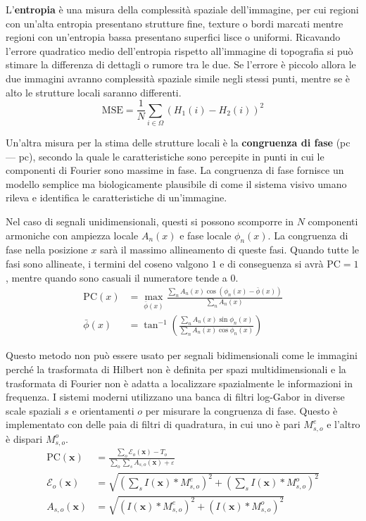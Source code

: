 \documentclass[../main.tex]{subfiles}
\begin{document}
L'\textbf{entropia} è una misura della complessità spaziale dell'immagine, per cui regioni con un'alta entropia presentano strutture fine, texture o bordi marcati mentre regioni con un'entropia bassa presentano superfici lisce o uniformi. Ricavando l'errore quadratico medio dell'entropia rispetto all'immagine di topografia si può stimare la differenza di dettagli o rumore tra le due. Se l'errore è piccolo allora le due immagini avranno complessità spaziale simile negli stessi punti, mentre se è alto le strutture locali saranno differenti.
\begin{equation}
	\text{MSE} = \frac{1}{N}\sum_{i\in\Omega}\left(H_1(i)-H_2(i)\right)^2
\end{equation}

Un'altra misura per la stima delle strutture locali è la \textbf{congruenza di fase} (\acrlong{pc} --- \acrshort{pc}), secondo la quale le caratteristiche sono percepite in punti in cui le componenti di Fourier sono massime in fase. La congruenza di fase fornisce un modello semplice ma biologicamente plausibile di come il sistema visivo umano rileva e identifica le caratteristiche di un'immagine.\cite{kovesi_1999,morrone_1988}

Nel caso di segnali unidimensionali, questi si possono scomporre in $N$ componenti armoniche con ampiezza locale $A_n(x)$ e fase locale $\phi_n(x)$. La congruenza di fase nella posizione $x$ sarà il massimo allineamento di queste fasi. Quando tutte le fasi sono allineate, i termini del coseno valgono $1$ e di conseguenza si avrà $\text{PC} = 1$, mentre quando sono casuali il numeratore tende a $0$.
\begin{align}
	\text{PC}(x) &= \underset{\bar{\phi}(x)}{\max}\frac{\sum_n A_n(x) \cos\left(\phi_n(x) - \bar{\phi}(x)\right)}{\sum_n A_n(x)}\\[6pt]
	\bar{\phi}(x) &= \tan^{-1}\left(\frac{\sum_n A_n(x)\sin\phi_n(x)}{\sum_n A_n(x)\cos\phi_n(x)}\right)
\end{align}

Questo metodo non può essere usato per segnali bidimensionali come le immagini perché la trasformata di Hilbert non è definita per spazi multidimensionali e la trasformata di Fourier non è adatta a localizzare spazialmente le informazioni in frequenza. I sistemi moderni utilizzano una banca di filtri log-Gabor in diverse scale spaziali $s$ e orientamenti $o$ per misurare la congruenza di fase. Questo è implementato con delle paia di filtri di quadratura, in cui uno è pari $M^e_{s,o}$ e l'altro è dispari $M^o_{s,o}$.\cite{kovesi_2003}
\begin{align}
	\text{PC}(\mathbf{x}) &= \frac{\sum_o \mathcal{E}_o(\mathbf{x}) - T_o}{\sum_o\sum_s A_{s,o}(\mathbf{x})+\varepsilon}\\[6pt]
	\mathcal{E}_o(\mathbf{x}) &= \sqrt{\left(\sum_s I(\mathbf{x}) * M^e_{s,o}\right)^2 + \left(\sum_s I(\mathbf{x}) * M^o_{s,o}\right)^2}\\[6pt]
	A_{s,o}(\mathbf{x}) &= \sqrt{\left(I(\mathbf{x}) * M^e_{s,o}\right)^2 + \left(I(\mathbf{x}) * M^o_{s,o}\right)^2}
\end{align}
\end{document}
